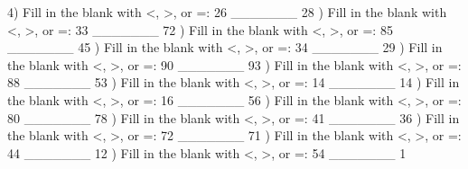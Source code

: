 \documentclass{article}%
\begin{document}
4) Fill in the blank with <, >, or =: 26 \_\_\_\_\_\_\_ 28%
\newline%
\newline%
) Fill in the blank with <, >, or =: 33 \_\_\_\_\_\_\_ 72%
\newline%
\newline%
) Fill in the blank with <, >, or =: 85 \_\_\_\_\_\_\_ 45%
\newline%
\newline%
) Fill in the blank with <, >, or =: 34 \_\_\_\_\_\_\_ 29%
\newline%
\newline%
) Fill in the blank with <, >, or =: 90 \_\_\_\_\_\_\_ 93%
\newline%
\newline%
) Fill in the blank with <, >, or =: 88 \_\_\_\_\_\_\_ 53%
\newline%
\newline%
) Fill in the blank with <, >, or =: 14 \_\_\_\_\_\_\_ 14%
\newline%
\newline%
) Fill in the blank with <, >, or =: 16 \_\_\_\_\_\_\_ 56%
\newline%
\newline%
) Fill in the blank with <, >, or =: 80 \_\_\_\_\_\_\_ 78%
\newline%
\newline%
) Fill in the blank with <, >, or =: 41 \_\_\_\_\_\_\_ 36%
\newline%
\newline%
) Fill in the blank with <, >, or =: 72 \_\_\_\_\_\_\_ 71%
\newline%
\newline%
) Fill in the blank with <, >, or =: 44 \_\_\_\_\_\_\_ 12%
\newline%
\newline%
) Fill in the blank with <, >, or =: 54 \_\_\_\_\_\_\_ 1%
\newline%
\end{document}
